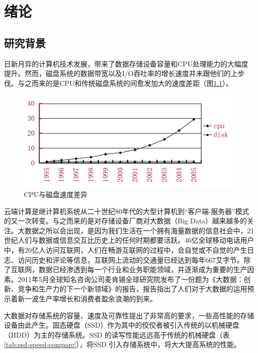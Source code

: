 
\chapter{绪论}
\label{cha:introduction}

\section{研究背景}
\label{sec:background}

日新月异的计算机技术发展，带来了数据存储设备容量和CPU处理能力的大幅度提升。然而，磁盘系统的数据带宽以及I/O吞吐率的增长速度并未跟他们的上步伐。与之而来的是CPU和传统磁盘系统的间愈发加大的速度差距（图\ref{fig:cpu-disk-diff}）。

\begin{figure}[H]
\centering
\includegraphics[width=0.7\linewidth]{./graph/cpu-disk-gap}
\caption{CPU与磁盘速度差异}
\label{fig:cpu-disk-diff}
\end{figure}

云端计算是继计算机系统从二十世纪80年代的大型计算机到“客户端-服务器”模式的又一次转变。与之而来的是对存储设备厂商对大数据（Big Data）越来越多的关注。大数据之所以会出现，是因为我们生活在一个拥有海量数据的信息社会中，21世纪人们与数据或信息交互比历史上的任何时期都要活跃。46亿全球移动电话用户中，有20亿人访问互联网，人们在畅游互联网的过程中，会自觉或不自觉的产生日志、访问历史和评论等信息，互联网上流动的交通量已经达到每年667艾字节。除了互联网，数据已经渗透到每一个行业和业务职能领域，并逐渐成为重要的生产因素。2011年5月全球知名咨询公司麦肯锡全球研究院发布了一份题为《大数据：创新、竞争和生产力的下一个新领域》的报告，报告指出了人们对于大数据的运用预示着新一波生产率增长和消费者盈余浪潮的到来。

大数据对存储系统的容量、速度及可靠性提出了非常高的要求，一些高性能的存储设备由此产生。固态硬盘（SSD）作为其中的佼佼者被引入传统的以机械硬盘（HDD）为主的存储系统。SSD 的读写性能远远高于传统的机械硬盘（表\ref{tab:ssd-speed-compare}），将SSD 引入存储系统中，将大大提高系统的性能。

